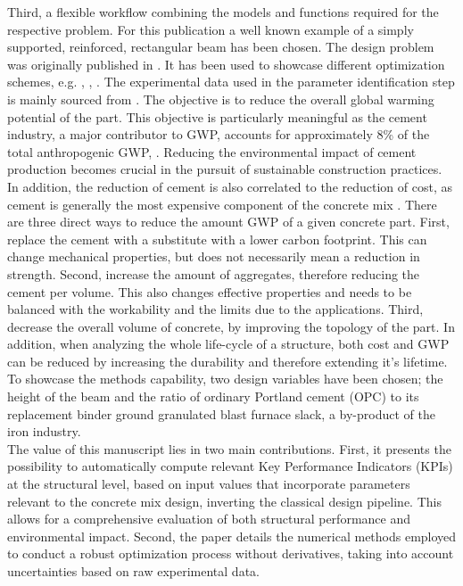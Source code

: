 Third, a flexible workflow combining the models and functions required for the respective problem. 
For this publication a well known example of a simply supported, reinforced, rectangular beam  has been chosen.
The design problem was originally published in \cite{everard1966reinforced}.
It has been used to showcase different optimization schemes, e.g. \cite{Chakrabarty_1992}, \cite{Coello_1997}, \cite{Pierott_2021}.
The experimental data used in the parameter identification step is mainly sourced from \cite{gruyaert2011}.
The objective is to reduce the overall global warming potential of the part.
This objective is particularly meaningful as the cement industry, a major contributor to GWP, accounts for approximately 8\% of the total anthropogenic GWP, \cite{Miller_2016}.
Reducing the environmental impact of cement production becomes crucial in the pursuit of sustainable construction practices.
In addition, the reduction of cement is also correlated to the reduction of cost, as cement is generally the most expensive component of the concrete mix \cite{Paya_Zaforteza_2009}.
There are three direct ways to reduce the amount GWP of a given concrete part.
First, replace the cement with a substitute with a lower carbon footprint.
This can change mechanical properties, but does not necessarily mean a reduction in strength.
Second, increase the amount of aggregates, therefore reducing the cement per volume.
This also changes effective properties and needs to be balanced with the workability and the limits due to the applications.
Third, decrease the overall volume of concrete, by improving the topology of the part.
In addition, when analyzing the whole life-cycle of a structure, both cost and GWP can be reduced by increasing the durability and therefore extending it's lifetime.
To showcase the methods capability, two design variables have been chosen; the height of the beam and the ratio of ordinary Portland cement (OPC) to its replacement binder ground granulated blast furnace slack, a by-product of the iron industry.\\
%
The value of this manuscript lies in two main contributions. 
First, it presents the possibility to automatically compute relevant Key Performance Indicators (KPIs) at the structural level, based on input values that incorporate parameters relevant to the concrete mix design, inverting the classical design pipeline.
This allows for a comprehensive evaluation of both structural performance and environmental impact. 
Second, the paper details the numerical methods employed to conduct a robust optimization process without derivatives, taking into account uncertainties based on raw experimental data.
